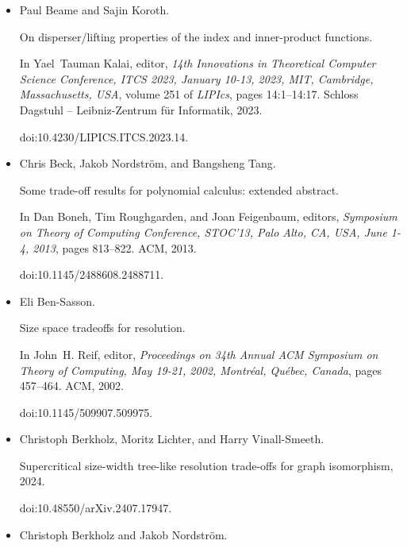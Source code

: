 \begin{itemize}
\item[] 
[4]

Paul Beame and Sajin Koroth.


On disperser/lifting properties of the index and inner-product
functions.


In Yael Tauman Kalai, editor, \emph{14th Innovations in Theoretical
Computer Science Conference, ITCS 2023, January 10-13, 2023, MIT,
Cambridge, Massachusetts, USA}, volume 251 of \emph{LIPIcs}, pages
14:1–14:17. Schloss Dagstuhl – Leibniz-Zentrum für Informatik, 2023.


doi:10.4230/LIPICS.ITCS.2023.14.





\item[] 
[5]

Chris Beck, Jakob Nordström, and Bangsheng Tang.


Some trade-off results for polynomial calculus: extended abstract.


In Dan Boneh, Tim Roughgarden, and Joan Feigenbaum, editors, \emph{Symposium on Theory of Computing Conference, STOC’13, Palo Alto, CA, USA,
June 1-4, 2013}, pages 813–822. ACM, 2013.


doi:10.1145/2488608.2488711.





\item[] 
[6]

Eli Ben-Sasson.


Size space tradeoffs for resolution.


In John H. Reif, editor, \emph{Proceedings on 34th Annual ACM
Symposium on Theory of Computing, May 19-21, 2002, Montréal,
Québec, Canada}, pages 457–464. ACM, 2002.


doi:10.1145/509907.509975.





\item[] 
[7]

Christoph Berkholz, Moritz Lichter, and Harry Vinall-Smeeth.


Supercritical size-width tree-like resolution trade-offs for graph
isomorphism, 2024.


doi:10.48550/arXiv.2407.17947.





\item[] 
[8]

Christoph Berkholz and Jakob Nordström.



\end{itemize}
